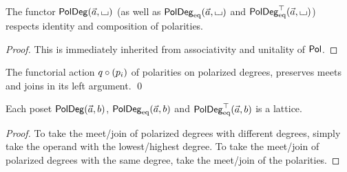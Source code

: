 \documentclass[a4paper]{memoir}
\begin{document}
\begin{corollary}
	The functor $\mathsf{PolDeg}(\vec a, {\llcorner\hspace{-.4ex}\lrcorner})$ (as well as $\mathsf{PolDeg}_{\mathrm{eq}}(\vec a, {\llcorner\hspace{-.4ex}\lrcorner})$ and $\mathsf{PolDeg}_{\mathrm{eq}}^\top(\vec a, {\llcorner\hspace{-.4ex}\lrcorner})$) respects identity and composition of polarities.
\end{corollary}
\begin{proof}
	This is immediately inherited from associativity and unitality of ${\mathsf{Pol}}$.
\end{proof}
\begin{corollary} \label{thm:pol-poldeg-lattice}
	The functorial action $q \circ ({p}_{i})$ of polarities on polarized degrees, preserves meets and joins in its left argument. \qed
\end{corollary}
\begin{proposition} \label{thm:poldeg-lattice}
	Each poset $\mathsf{PolDeg}(\vec a, b)$, $\mathsf{PolDeg}_{\mathrm{eq}}(\vec a, b)$ and $\mathsf{PolDeg}_{\mathrm{eq}}^\top(\vec a, b)$ is a lattice.
\end{proposition}
\begin{proof}
	To take the meet/join of polarized degrees with different degrees, simply take the operand with the lowest/highest degree.
	To take the meet/join of polarized degrees with the same degree, take the meet/join of the polarities.
\end{proof}
\end{document}

